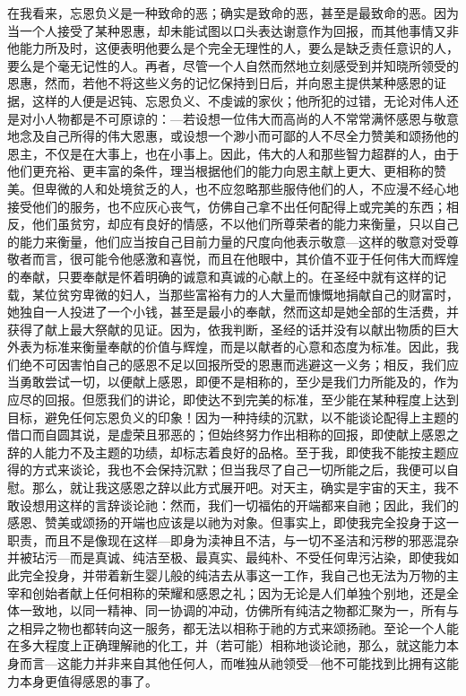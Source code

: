 在我看来，忘恩负义是一种致命的恶；确实是致命的恶，甚至是最致命的恶。因为当一个人接受了某种恩惠，却未能试图以口头表达谢意作为回报，而其他事情又非他能力所及时，这便表明他要么是个完全无理性的人，要么是缺乏责任意识的人，要么是个毫无记性的人。再者，尽管一个人自然而然地立刻感受到并知晓所领受的恩惠，然而，若他不将这些义务的记忆保持到日后，并向恩主提供某种感恩的证据，这样的人便是迟钝、忘恩负义、不虔诚的家伙；他所犯的过错，无论对伟人还是对小人物都是不可原谅的：—若设想一位伟大而高尚的人不常常满怀感恩与敬意地念及自己所得的伟大恩惠，或设想一个渺小而可鄙的人不尽全力赞美和颂扬他的恩主，不仅是在大事上，也在小事上。因此，伟大的人和那些智力超群的人，由于他们更充裕、更丰富的条件，理当根据他们的能力向恩主献上更大、更相称的赞美。但卑微的人和处境贫乏的人，也不应忽略那些服侍他们的人，不应漫不经心地接受他们的服务，也不应灰心丧气，仿佛自己拿不出任何配得上或完美的东西；相反，他们虽贫穷，却应有良好的情感，不以他们所尊荣者的能力来衡量，只以自己的能力来衡量，他们应当按自己目前力量的尺度向他表示敬意—这样的敬意对受尊敬者而言，很可能令他感激和喜悦，而且在他眼中，其价值不亚于任何伟大而辉煌的奉献，只要奉献是怀着明确的诚意和真诚的心献上的。在圣经中就有这样的记载，某位贫穷卑微的妇人，当那些富裕有力的人大量而慷慨地捐献自己的财富时，她独自一人投进了一个小钱，甚至是最小的奉献，然而这却是她全部的生活费，并获得了献上最大祭献的见证。因为，依我判断，圣经的话并没有以献出物质的巨大外表为标准来衡量奉献的价值与辉煌，而是以献者的心意和态度为标准。因此，我们绝不可因害怕自己的感恩不足以回报所受的恩惠而逃避这一义务；相反，我们应当勇敢尝试一切，以便献上感恩，即便不是相称的，至少是我们力所能及的，作为应尽的回报。但愿我们的讲论，即使达不到完美的标准，至少能在某种程度上达到目标，避免任何忘恩负义的印象！因为一种持续的沉默，以不能谈论配得上主题的借口而自圆其说，是虚荣且邪恶的；但始终努力作出相称的回报，即使献上感恩之辞的人能力不及主题的功绩，却标志着良好的品格。至于我，即使我不能按主题应得的方式来谈论，我也不会保持沉默；但当我尽了自己一切所能之后，我便可以自慰。那么，就让我这感恩之辞以此方式展开吧。对天主，确实是宇宙的天主，我不敢设想用这样的言辞谈论祂：然而，我们一切福佑的开端都来自祂；因此，我们的感恩、赞美或颂扬的开端也应该是以祂为对象。但事实上，即使我完全投身于这一职责，而且不是像现在这样—即身为渎神且不洁，与一切不圣洁和污秽的邪恶混杂并被玷污—而是真诚、纯洁至极、最真实、最纯朴、不受任何卑污沾染，即使我如此完全投身，并带着新生婴儿般的纯洁去从事这一工作，我自己也无法为万物的主宰和创始者献上任何相称的荣耀和感恩之礼；因为无论是人们单独个别地，还是全体一致地，以同一精神、同一协调的冲动，仿佛所有纯洁之物都汇聚为一，所有与之相异之物也都转向这一服务，都无法以相称于祂的方式来颂扬祂。至论一个人能在多大程度上正确理解祂的化工，并（若可能）相称地谈论祂，那么，就这能力本身而言—这能力并非来自其他任何人，而唯独从祂领受—他不可能找到比拥有这能力本身更值得感恩的事了。\par

